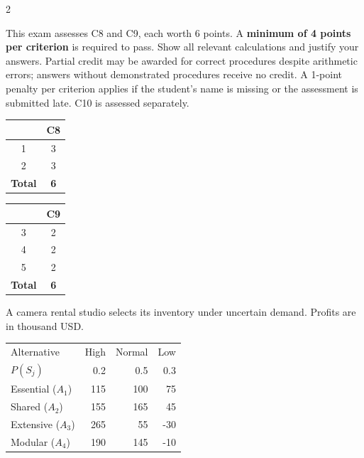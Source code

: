 	\begin{multicols}{2}
		\raggedcolumns
		
		This exam assesses C8 and C9, each worth 6 points. A \textbf{minimum of 4 points per criterion} is required to pass. Show all relevant calculations and justify your answers. Partial credit may be awarded for correct procedures despite arithmetic errors; answers without demonstrated procedures receive no credit. A 1-point penalty per criterion applies if the student's name is missing or the assessment is submitted late. C10 is assessed separately.
		
		\vspace{-7mm}
		\begin{center}
			\begin{tabular}{|c|c|}
				\hline
				\textbf{\textnumero} & \textbf{C8} \\ \hline
				1 & 3 \\ \hline
				2 & 3 \\ \hline
				\textbf{Total} & \textbf{6} \\ \hline
			\end{tabular}
			\hspace{1cm}
			\begin{tabular}{|c|c|}
				\hline
				\textbf{\textnumero} & \textbf{C9} \\ \hline
				3 & 2 \\ \hline
				4 & 2 \\ \hline
				5 & 2 \\ \hline
				\textbf{Total} & \textbf{6} \\ \hline
			\end{tabular}
		\end{center}
		\vspace{-4mm}
		
		
A camera rental studio selects its inventory under uncertain demand. Profits are in thousand USD.

\vspace{-3mm}
\begin{center}\small\setlength{\tabcolsep}{4pt}
	\begin{tabular}{lrrr}\toprule
		Alternative & High & Normal & Low\\
		$P(S_j)$ & 0.2 & 0.5 & 0.3\\ \midrule
				Essential ($A_1$) & 115 & 100 & 75\\
		Shared ($A_2$) & 155 & 165 & 45\\
		Extensive ($A_3$) & 265 & 55 & -30\\
		Modular ($A_4$) & 190 & 145 & -10\\
		\bottomrule
	\end{tabular}
\end{center} \vspace*{-3mm}


\end{multicols}
